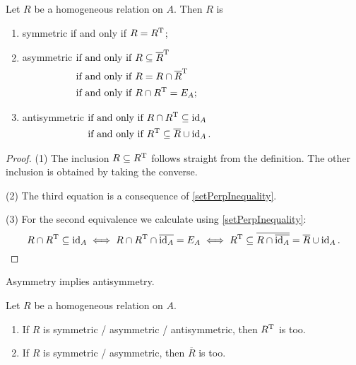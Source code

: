 \begin{lemma} \label{relationalSymmetryEquivalents}
Let $R$ be a homogeneous relation on $A$. Then $R$ is
\begin{enumerate}
\item symmetric \textup{if and only if} $R = R^{\mathrm{T}}$;
\item asymmetric $\begin{aligned}[t]
&\text{\textup{if and only if}}\; R \subseteq \overline{R}^{\mathrm{T}} \\
&\text{\textup{if and only if}}\; R = R \cap \overline{R}^{\mathrm{T}} \\
&\text{\textup{if and only if}}\; R \cap R^{\mathrm{T}} = E_A;
\end{aligned}$
\item antisymmetric $\begin{aligned}[t]
&\text{\textup{if and only if}}\; R\cap R^{\mathrm{T}} \subseteq \operatorname{id}_A \\
&\text{\textup{if and only if}}\; R^{\mathrm{T}}\subseteq \overline{R}\cup \operatorname{id}_A.
\end{aligned}$
\end{enumerate}
\end{lemma}
\begin{proof}
(1) The inclusion $R\subseteq R^{\mathrm{T}}$ follows straight from the definition. The other inclusion is obtained by taking the converse.

(2) The third equation is a consequence of \ref{setPerpInequality}.

(3) For the second equivalence we calculate using \ref{setPerpInequality}:
\[ R\cap R^{\mathrm{T}} \subseteq \operatorname{id}_A \iff R\cap R^{\mathrm{T}} \cap\overline{\operatorname{id}_A} = E_A \iff R^{\mathrm{T}} \subseteq \overline{R \cap \overline{\operatorname{id}_A}} = \overline{R} \cup \operatorname{id}_A. \]
\end{proof}
\begin{corollary} \label{asymmetryAntisymmetry}
Asymmetry implies antisymmetry.
\end{corollary}

\begin{lemma}
Let $R$ be a homogeneous relation on $A$.
\begin{enumerate}
\item If $R$ is symmetric / asymmetric / antisymmetric, then $R^{\mathrm{T}}$ is too.
\item If $R$ is symmetric / asymmetric, then $\overline{R}$ is too.
\end{enumerate}
\end{lemma}

